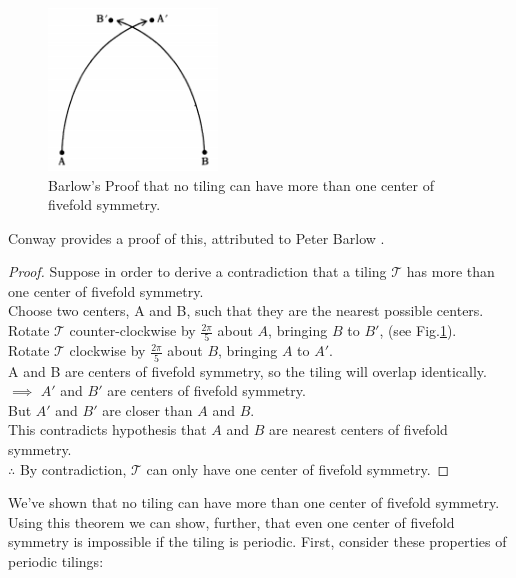 \documentclass[
  oneside,
  11pt, a4paper,
  footinclude=true,
  headinclude=true,
  cleardoublepage=empty
]{scrbook}
\begin{document}
\begin{figure}[H]
	\centering
	\includegraphics[width=0.4\textwidth]{proof}
    \caption{Barlow's Proof that no tiling can have more than one center of fivefold symmetry.}
    \label{fig:fivefoldproof}
\end{figure}

Conway provides a proof of this, attributed to Peter Barlow \cite{Gardner1997}.

\begin{proof}
Suppose in order to derive a contradiction that a tiling $\mathcal{T}$ has more than one center of fivefold symmetry.\\
Choose two centers, A and B, such that they are the nearest possible centers. \\
Rotate $\mathcal{T}$ counter-clockwise by $\frac{2\pi}{5}$ about $A$, bringing $B$ to $B'$, (see Fig.\ref{fig:fivefoldproof}).\\
Rotate $\mathcal{T}$ clockwise by $\frac{2\pi}{5}$ about $B$, bringing $A$ to $A'$.\\
A and B are centers of fivefold symmetry, so the tiling will overlap identically.\\
$\implies$ $A'$ and $B'$ are centers of fivefold symmetry.\\
But $A'$ and $B'$ are closer than $A$ and $B$.\\
This contradicts hypothesis that $A$ and $B$ are nearest centers of fivefold symmetry.\\
$\therefore$ By contradiction, $\mathcal{T}$ can only have one center of fivefold symmetry.
\end{proof}

We've shown that no tiling can have more than one center of fivefold symmetry. Using this theorem we can show, further, that even one center of fivefold symmetry is impossible if the tiling is periodic. First, consider these properties of periodic tilings:
\end{document}
